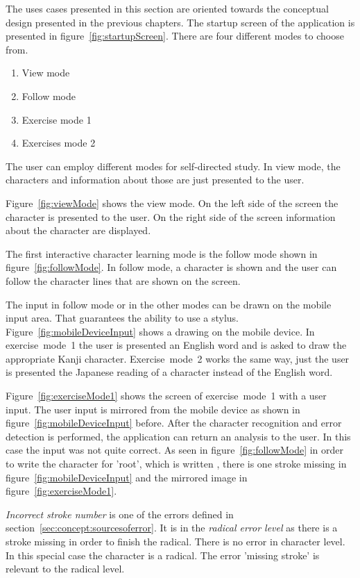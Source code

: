 The uses cases presented in this section are oriented towards the conceptual
design presented in the previous chapters. The startup screen of the application
is presented in figure~\ref{fig:startupScreen}. There are four different modes 
to choose from.
\begin{enumerate}
\item View mode
\item Follow mode
\item Exercise mode 1
\item Exercises mode 2
\end{enumerate}
The user can employ different modes for self-directed study. In view mode,
the characters and information about those are just presented to the user.

Figure~\ref{fig:viewMode} shows the view mode. On the left side of the screen
the character is presented to the user. On the right side of the screen
information about the character are displayed.

The first interactive character learning mode is the follow mode shown in
figure~\ref{fig:followMode}. In follow mode, a character is shown and the user
can follow the character lines that are shown on the screen. 

The input in follow mode or in the other modes can be drawn on the mobile input
area. That guarantees the ability to use a stylus. 
Figure~\ref{fig:mobileDeviceInput} shows a drawing on the mobile device.
In exercise~mode~1 the user is presented an English word and is asked 
to draw the appropriate Kanji character. Exercise~mode~2 works the same way,
just the user is presented the Japanese reading of a character instead of the
English word.

Figure~\ref{fig:exerciseMode1} shows the screen of exercise~mode~1 with a
user input. The user input is mirrored from the mobile device as shown in 
figure~\ref{fig:mobileDeviceInput} before.
After the character recognition and error detection is performed,
the application can return an analysis to the user.
In this case the input was not quite correct. As seen in 
figure~\ref{fig:followMode} in order to write the character for 'root',
which is written , there is one stroke missing in 
figure~\ref{fig:mobileDeviceInput} and the mirrored image in
figure~\ref{fig:exerciseMode1}.

\emph{Incorrect stroke number} is one of the errors defined in 
section~\ref{sec:concept:sourcesoferror}. It is in the 
\emph{radical error level} as there is a stroke missing in order to
finish the radical.
There is no error in character level. In this special case the character
is a radical. The error 'missing stroke' is relevant to the radical level.


